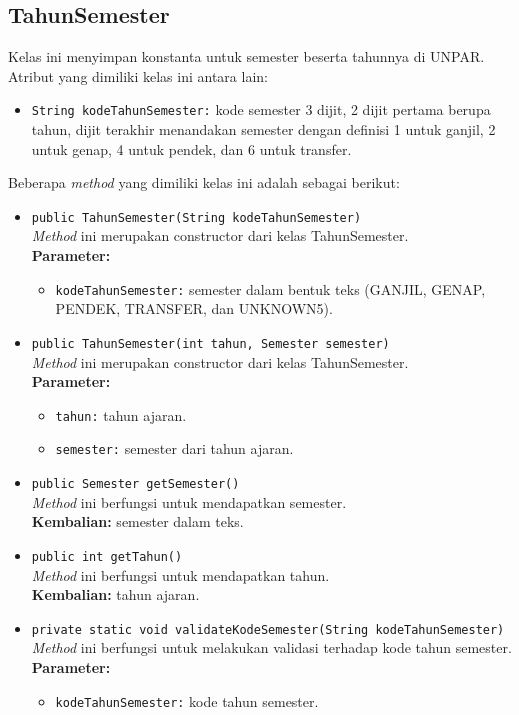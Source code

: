 \subsection{TahunSemester}
Kelas ini menyimpan konstanta untuk semester beserta tahunnya di UNPAR. Atribut yang dimiliki kelas ini antara lain:
\begin{itemize}
	\item \texttt{String kodeTahunSemester:} kode semester 3 dijit, 2 dijit pertama berupa tahun, dijit terakhir menandakan semester dengan definisi 1 untuk ganjil, 2 untuk genap, 4 untuk pendek, dan 6 untuk transfer.
\end{itemize}
Beberapa \textit{method} yang dimiliki kelas ini adalah sebagai berikut:
\begin{itemize}
	\item \texttt{public TahunSemester(String kodeTahunSemester)} \\
	\textit{Method} ini merupakan constructor dari kelas TahunSemester. \\
	\textbf{Parameter:}
	\begin{itemize}
		\item \texttt{kodeTahunSemester:} semester dalam bentuk teks (GANJIL, GENAP, PENDEK, TRANSFER, dan UNKNOWN5).
	\end{itemize}
	
	\item \texttt{public TahunSemester(int tahun, Semester semester)} \\
	\textit{Method} ini merupakan constructor dari kelas TahunSemester. \\
	\textbf{Parameter:}
	\begin{itemize}
		\item \texttt{tahun:} tahun ajaran.
		\item \texttt{semester:} semester dari tahun ajaran.
	\end{itemize}
	
	\item \texttt{public Semester getSemester()} \\
	\textit{Method} ini berfungsi untuk mendapatkan semester. \\
	\textbf{Kembalian:} semester dalam teks.
	
	\item \texttt{public int getTahun()} \\
	\textit{Method} ini berfungsi untuk mendapatkan tahun. \\
	\textbf{Kembalian:} tahun ajaran.
	
	\item \texttt{private static void validateKodeSemester(String kodeTahunSemester)} \\
	\textit{Method} ini berfungsi untuk melakukan  validasi terhadap kode tahun semester. \\
	\textbf{Parameter:}
	\begin{itemize}
		\item \texttt{kodeTahunSemester:} kode tahun semester.
	\end{itemize}
\end{itemize}